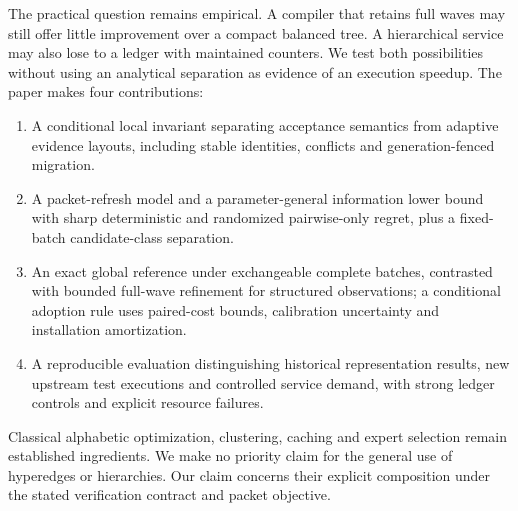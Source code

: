 \documentclass[10pt,journal,compsoc]{IEEEtran}
\theoremstyle{definition}\newtheorem{definition}[theorem]{Definition}
\begin{document}
The practical question remains empirical. A compiler that retains full
waves may still offer little improvement over a compact balanced tree.
A hierarchical service may also lose to a ledger with maintained counters.
We test both possibilities without using an analytical separation as
evidence of an execution speedup. The paper makes four contributions:
\begin{enumerate}
\item A conditional local invariant separating acceptance semantics from
adaptive evidence layouts, including stable identities, conflicts and
generation-fenced migration.
\item A packet-refresh model and a parameter-general information lower
bound with sharp deterministic and randomized pairwise-only regret,
plus a fixed-batch candidate-class separation.
\item An exact global reference under exchangeable complete batches,
contrasted with bounded full-wave refinement for structured observations;
a conditional adoption rule uses paired-cost bounds, calibration
uncertainty and installation amortization.
\item A reproducible evaluation distinguishing historical representation
results, new upstream test executions and controlled service demand, with
strong ledger controls and explicit resource failures.
\end{enumerate}
Classical alphabetic optimization, clustering, caching and expert selection
remain established ingredients. We make no priority claim for the general
use of hyperedges or hierarchies. Our claim concerns their explicit
composition under the stated verification contract and packet objective.
\end{document}
